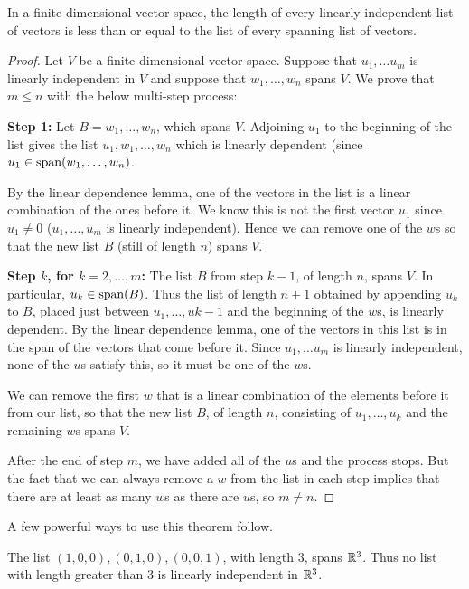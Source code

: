 \begin{theorem}
    In a finite-dimensional vector space, the length of every linearly independent list of vectors is less than or equal to the list of every spanning list of vectors.
\end{theorem}
\begin{proof}
    Let $V$ be a finite-dimensional vector space. Suppose that $u_1, \dots u_m$ is linearly independent in $V$ and suppose that $w_1, \dots, w_n$ spans $V$. We prove that $m \le n$ with the below multi-step process:

    \textbf{Step 1:} Let $B = w_1, \dots, w_n$, which spans $V$. Adjoining $u_1$ to the beginning of the list gives the list $u_1, w_1, \dots, w_n$ which is linearly dependent (since $u_1\in\operatorname{span}(w_1, \dots, w_n)$.

    By the linear dependence lemma, one of the vectors in the list is a linear combination of the ones before it. We know this is not the first vector $u_1$ since $u_1\ne 0$ ($u_1, \dots, u_m$ is linearly independent). Hence we can remove one of the $w$s so that the new list $B$ (still of length $n$) spans $V$.

    \textbf{Step $k$, for $k =2, \dots, m$:}
    The list $B$ from step $k-1$, of length $n$, spans $V$. In particular, $u_k\in \operatorname{span}(B)$. Thus the list of length $n+1$ obtained by appending $u_k$ to $B$, placed just between $u_1, \dots, u{k-1}$ and the beginning of the $w$s, is linearly dependent. By the linear dependence lemma, one of the vectors in this list is in the span of the vectors that come before it. Since $u_1, \dots u_m$ is linearly independent, none of the $u$s satisfy this, so it must be one of the $w$s.

    We can remove the first $w$ that is a linear combination of the elements before it from our list, so that the new list $B$, of length $n$,  consisting of $u_1, \dots, u_k$ and the remaining $w$s spans $V$.

    After the end of step $m$, we have added all of the $u$s and the process stops. But the fact that we can always remove a $w$ from the list in each step implies that there are at least as many $w$s as there are $u$s, so $m \ne n$.
\end{proof}
A few powerful ways to use this theorem follow.
\begin{example}
    The list $(1,0,0),(0,1,0),(0,0,1)$, with length $3$, spans $\mathbb{R}^3$. Thus no list with length greater than $3$ is linearly independent in $\mathbb{R}^3$.
\end{example}
